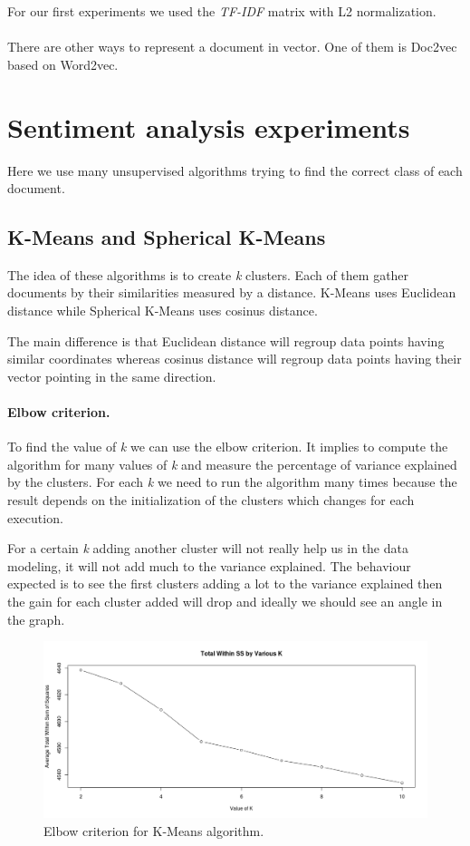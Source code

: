 \documentclass{article}
\begin{document}
For our first experiments we used the \textit{TF-IDF} matrix with L2 normalization.
\\\\
There are other ways to represent a document in vector. One of them is Doc2vec based on Word2vec.


\section{Sentiment analysis experiments}

Here we use many unsupervised algorithms trying to find the correct class of each document.


\subsection{K-Means and Spherical K-Means}

The idea of these algorithms is to create \textit{k} clusters. Each of them gather documents by their similarities measured by a distance. K-Means uses Euclidean distance while Spherical K-Means uses cosinus distance.

The main difference is that Euclidean distance will regroup data points having similar coordinates whereas cosinus distance will regroup data points having their vector pointing in the same direction.

\paragraph{Elbow criterion.}
To find the value of \textit{k} we can use the elbow criterion. It implies to compute the algorithm for many values of \textit{k} and measure the percentage of variance explained by the clusters. For each \textit{k} we need to run the algorithm many times because the result depends on the initialization of the clusters which changes for each execution.

For a certain \textit{k} adding another cluster will not really help us in the data modeling, it will not add much to the variance explained. The behaviour expected is to see the first clusters adding a lot to the variance explained then the gain for each cluster added will drop and ideally we should see an angle in the graph.

\begin{figure}[H] 
\centering
\includegraphics[width=\textwidth]{Kmeans_tf-idf-l2_elbow_criterion.png}
\caption{Elbow criterion for K-Means algorithm.}
\label{fig:elbow}
\end{figure}
\end{document}
